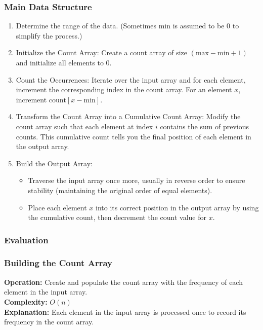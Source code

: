 \subsubsection{Main Data Structure}
\begin{enumerate}
    \item Determine the range of the data. (Sometimes min is assumed to be 0 to simplify the process.)
    \item Initialize the Count Array: Create a count array of size \((\text{max} - \text{min} + 1)\) and initialize all elements to 0.
    \item Count the Occurrences: Iterate over the input array and for each element, increment the corresponding index in the count array. For an element \(x\), increment \(\text{count}[x - \text{min}]\).
    \item Transform the Count Array into a Cumulative Count Array: Modify the count array such that each element at index \(i\) contains the sum of previous counts. This cumulative count tells you the final position of each element in the output array.
    \item Build the Output Array:
    \begin{itemize}
        \item Traverse the input array once more, usually in reverse order to ensure stability (maintaining the original order of equal elements).
        \item Place each element \(x\) into its correct position in the output array by using the cumulative count, then decrement the count value for \(x\).
    \end{itemize}
\end{enumerate}



\subsubsection{Evaluation}
\subsubsection{Building the Count Array}
\textbf{Operation:} Create and populate the count array with the frequency of each element in the input array. \\
\textbf{Complexity:} \(O(n)\) \\
\textbf{Explanation:} Each element in the input array is processed once to record its frequency in the count array.

